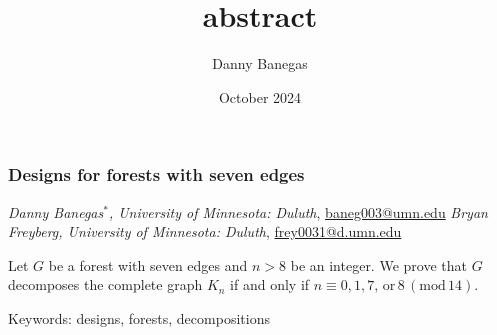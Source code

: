 \documentclass{article}
\title{abstract}
\author{Danny Banegas}
\date{October 2024}
\begin{document}

\subsubsection*{Designs for forests with seven edges}



\emph{Danny Banegas$^{*}$, University of Minnesota: Duluth}, \href{mailto:baneg003@umn.edu}{baneg003@umn.edu} \newline\emph{Bryan Freyberg, University of Minnesota: Duluth}, \href{mailto:frey0031@d.umn.edu}{frey0031@d.umn.edu}



  \medskip



\noindent Let $G$ be a forest with seven edges and
$n > 8$ be an integer. We prove that $G$ decomposes
the complete graph $K_{n}$ if and only if $n\equiv 0, 1, 7,\,\text{or}\,8\,
(\mathrm{mod}\,14)$.


  \medskip



  Keywords:  designs, forests, decompositions
\end{document}
